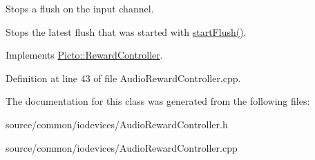Stops a flush on the input channel. 

Stops the latest flush that was started with \hyperlink{class_picto_1_1_audio_reward_controller_a03696b14900697ce67251029841f25f6}{start\-Flush()}. 

Implements \hyperlink{class_picto_1_1_reward_controller_a5a14b4f103def1711b485cc05f4c53bb}{Picto\-::\-Reward\-Controller}.



Definition at line 43 of file Audio\-Reward\-Controller.\-cpp.



The documentation for this class was generated from the following files\-:\begin{DoxyCompactItemize}
\item 
source/common/iodevices/Audio\-Reward\-Controller.\-h\item 
source/common/iodevices/Audio\-Reward\-Controller.\-cpp\end{DoxyCompactItemize}
